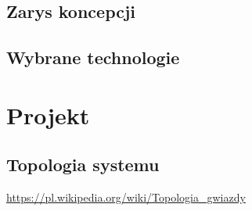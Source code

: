 \documentclass[eng,oneside]{mgr}
\begin{document}
\section{Zarys koncepcji}
\section{Wybrane technologie}

\chapter{Projekt}
\section{Topologia systemu}
\url{https://pl.wikipedia.org/wiki/Topologia_gwiazdy}
\end{document}

